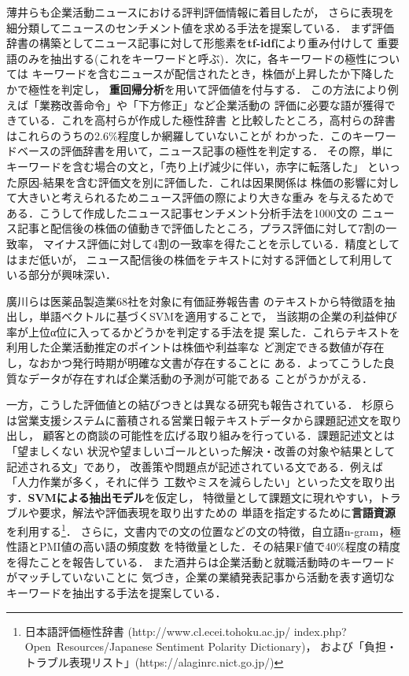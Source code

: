\documentclass[twocolumn]{jarticle}
\begin{document}
薄井ら\cite{usui2014}も企業活動ニュースにおける評判評価情報に着目したが，
さらに表現を細分類してニュースのセンチメント値を求める手法を提案している．
まず評価辞書の構築としてニュース記事に対して形態素を{\bf tf-idf}により重み付けして
重要語のみを抽出する(これをキーワードと呼ぶ)．次に，各キーワードの極性については
キーワードを含むニュースが配信されたとき，株価が上昇したか下降したかで極性を判定し，
{\bf 重回帰分析}を用いて評価値を付与する．
この方法により例えば「業務改善命令」や「下方修正」など企業活動の
評価に必要な語が獲得できている．これを高村らが作成した極性辞書\cite{takamura05}
と比較したところ，高村らの辞書はこれらのうちの2.6\%程度しか網羅していないことが
わかった．このキーワードベースの評価辞書を用いて，ニュース記事の極性を判定する．
その際，単にキーワードを含む場合の文と，「売り上げ減少に伴い，赤字に転落した」
といった原因-結果を含む評価文を別に評価した．これは因果関係は
株価の影響に対して大きいと考えられるためニュース評価の際により大きな重み
を与えるためである．こうして作成したニュース記事センチメント分析手法を1000文の
ニュース記事と配信後の株価の値動きで評価したところ，プラス評価に対して7割の一致率，
マイナス評価に対して4割の一致率を得たことを示している．精度としてはまだ低いが，
ニュース配信後の株価をテキストに対する評価として利用している部分が興味深い．

廣川\cite{hirokawa2013}らは医薬品製造業68社を対象に有価証券報告書
のテキストから特徴語を抽出し，単語ベクトルに基づくSVMを適用することで，
当該期の企業の利益伸び率が上位α位に入ってるかどうかを判定する手法を提
案した．これらテキストを利用した企業活動推定のポイントは株価や利益率な
ど測定できる数値が存在し，なおかつ発行時期が明確な文書が存在することに
ある．よってこうした良質なデータが存在すれば企業活動の予測が可能である
ことがうかがえる．

一方，こうした評価値との結びつきとは異なる研究も報告されている．
杉原ら\cite{sugihara2012}は営業支援システムに蓄積される営業日報テキストデータから課題記述文を取り出し，
顧客との商談の可能性を広げる取り組みを行っている．課題記述文とは「望ましくない
状況や望ましいゴールといった解決・改善の対象や結果として記述される文」であり，
改善策や問題点が記述されている文である．例えば「人力作業が多く，それに伴う
工数やミスを減らしたい」といった文を取り出す．{\bf SVMによる抽出モデル}を仮定し，
特徴量として課題文に現れやすい，トラブルや要求，解法や評価表現を取り出すための
単語を指定するために{\bf 言語資源}を利用する\footnote{日本語評価極性辞書
(http://www.cl.ecei.tohoku.ac.jp/
index.php?Open~Resources\slash{}Japanese Sentiment
 Polarity Dictionary)，
および「負担・トラブル表現リスト」(https://alaginrc.nict.go.jp/)}．
さらに，文書内での文の位置などの文の特徴，自立語n-gram，極性語とPMI値の高い語の頻度数
を特徴量とした．その結果F値で40\%程度の精度を得たことを報告している．
また酒井\cite{sakai2014}らは企業活動と就職活動時のキーワードがマッチしていないことに
気づき，企業の業績発表記事から活動を表す適切なキーワードを抽出する手法を提案している．
\end{document}
